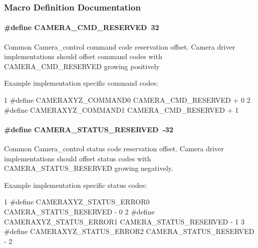 \subsubsection{Macro Definition Documentation}
\paragraph[{C\+A\+M\+E\+R\+A\+\_\+\+C\+M\+D\+\_\+\+R\+E\+S\+E\+R\+V\+E\+D}]{\setlength{\rightskip}{0pt plus 5cm}\#define C\+A\+M\+E\+R\+A\+\_\+\+C\+M\+D\+\_\+\+R\+E\+S\+E\+R\+V\+E\+D~32}\label{_camera_8h_aed2b3df48a75ec7e6e78320bb3a48eb9}
Common Camera\+\_\+control command code reservation offset. Camera driver implementations should offset command codes with C\+A\+M\+E\+R\+A\+\_\+\+C\+M\+D\+\_\+\+R\+E\+S\+E\+R\+V\+E\+D growing positively

Example implementation specific command codes\+: 
\begin{DoxyCode}
1 #define CAMERAXYZ\_COMMAND0       CAMERA\_CMD\_RESERVED + 0
2 #define CAMERAXYZ\_COMMAND1       CAMERA\_CMD\_RESERVED + 1
\end{DoxyCode}
\paragraph[{C\+A\+M\+E\+R\+A\+\_\+\+S\+T\+A\+T\+U\+S\+\_\+\+R\+E\+S\+E\+R\+V\+E\+D}]{\setlength{\rightskip}{0pt plus 5cm}\#define C\+A\+M\+E\+R\+A\+\_\+\+S\+T\+A\+T\+U\+S\+\_\+\+R\+E\+S\+E\+R\+V\+E\+D~-\/32}\label{_camera_8h_a13b3728d2673d72db6cc71744a0cbedf}
Common Camera\+\_\+control status code reservation offset. Camera driver implementations should offset status codes with C\+A\+M\+E\+R\+A\+\_\+\+S\+T\+A\+T\+U\+S\+\_\+\+R\+E\+S\+E\+R\+V\+E\+D growing negatively.

Example implementation specific status codes\+: 
\begin{DoxyCode}
1 #define CAMERAXYZ\_STATUS\_ERROR0  CAMERA\_STATUS\_RESERVED - 0
2 #define CAMERAXYZ\_STATUS\_ERROR1  CAMERA\_STATUS\_RESERVED - 1
3 #define CAMERAXYZ\_STATUS\_ERROR2  CAMERA\_STATUS\_RESERVED - 2
\end{DoxyCode}
